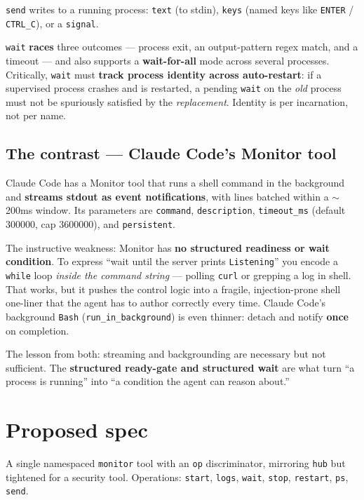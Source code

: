 \documentclass[11pt]{article}
\begin{document}
\texttt{send} writes to a running process: \texttt{text} (to stdin), \texttt{keys}
(named keys like \texttt{ENTER} / \texttt{CTRL\_C}), or a \texttt{signal}.

\texttt{wait} \textbf{races} three outcomes --- process exit, an output-pattern
regex match, and a timeout --- and also supports a \textbf{wait-for-all} mode
across several processes. Critically, \texttt{wait} must \textbf{track process
identity across auto-restart}: if a supervised process crashes and is restarted, a
pending \texttt{wait} on the \textit{old} process must not be spuriously satisfied
by the \textit{replacement}. Identity is per incarnation, not per name.

\subsection{The contrast --- Claude Code's Monitor tool}

Claude Code has a Monitor tool \citep{cc-monitor} that runs a shell command in the
background and \textbf{streams stdout as event notifications}, with lines batched
within a $\sim$200ms window. Its parameters are \texttt{command},
\texttt{description}, \texttt{timeout\_ms} (default 300000, cap 3600000), and
\texttt{persistent}.

The instructive weakness: Monitor has \textbf{no structured readiness or wait
condition}. To express ``wait until the server prints \texttt{Listening}'' you
encode a \texttt{while} loop \textit{inside the command string} --- polling
\texttt{curl} or grepping a log in shell. That works, but it pushes the control
logic into a fragile, injection-prone shell one-liner that the agent has to author
correctly every time. Claude Code's background \texttt{Bash}
(\texttt{run\_in\_background}) is even thinner: detach and notify \textbf{once} on
completion.

The lesson from both: streaming and backgrounding are necessary but not
sufficient. The \textbf{structured ready-gate and structured wait} are what turn
``a process is running'' into ``a condition the agent can reason about.''

\section{Proposed spec}

A single namespaced \texttt{monitor} tool with an \texttt{op} discriminator,
mirroring \texttt{hub} but tightened for a security tool. Operations:
\texttt{start}, \texttt{logs}, \texttt{wait}, \texttt{stop}, \texttt{restart},
\texttt{ps}, \texttt{send}.
\end{document}
